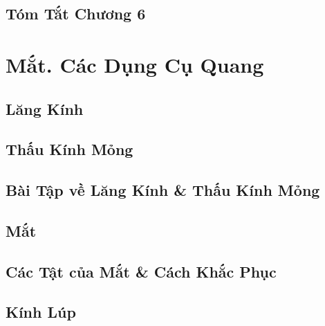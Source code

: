 \documentclass[oneside]{book}
\numberwithin{equation}{section}
\begin{document}

\section{Tóm Tắt Chương 6}


\chapter{Mắt. Các Dụng Cụ Quang}

\section{Lăng Kính}


\section{Thấu Kính Mỏng}


\section{Bài Tập về Lăng Kính \& Thấu Kính Mỏng}


\section{Mắt}


\section{Các Tật của Mắt \& Cách Khắc Phục}


\section{Kính Lúp}
\end{document}
